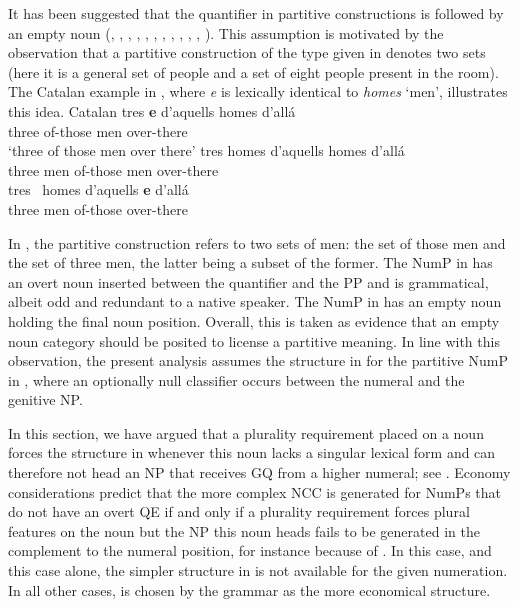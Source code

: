 \documentclass[output=paper,
modfonts,
newtxmath,
hidelinks
]{langscibook}
\begin{document}
It has been suggested that the quantifier in partitive constructions is followed by an empty noun (\citealt{Milner1978}, \citealt{Bonet1986}, \citealt{Abney1987}, \citealt{Hernanz-Brucart1987}, \citealt{Delsing1988, Delsing1993}, \citealt{Ramos1992}, \citealt{Cardinaletti-Giusti1992, Cardinaletti-Giusti2006}, \citealt{Sleeman1996}, \citealt{Doetjes1997}, \citealt{Barker1998}, \citealt{Brucart-Rigau2002}, \citealt{Ionin-etal2006}). This assumption is motivated by the observation that a partitive construction of the type given in  denotes two sets (here it is a general set of people and a set of eight people present in the room). The Catalan example in , where \textit{e} is lexically identical to \textit{homes} ‘men’, illustrates this idea. 
\ea Catalan \citep[27]{MartiiGirbau2010} \label{ex26}
	\ea \label{ex26a}
		\gll tres  \textbf{e}  d’aquells  homes     d’allá\\
			 three {} of-those men over-there\\
		\glt `three of those men over there'
	\ex \label{ex26b}
		\gll tres homes d’aquells homes d’allá\\
			 three men of-those men over-there\\
    \ex \label{ex26c}
		\gll tres~   homes   d’aquells   \textbf{e}   d’allá~ ~\\
			 three men of-those { } over-there\\
	\z
\z

\noindent In , the partitive construction refers to two sets of men: the set of those men and the set of three men, the latter being a subset of the former. The NumP in  has an overt noun inserted between the quantifier and the PP and is grammatical, albeit odd and redundant to a native speaker. The NumP in  has an empty noun holding the final noun position. Overall, this is taken as evidence that an empty noun category should be posited to license a partitive meaning. In line with this observation, the present analysis assumes the structure in  for the partitive NumP in , where an optionally null classifier occurs between the numeral and the genitive NP. 

In this section, we have argued that a plurality requirement placed on a noun forces the structure in  whenever this noun lacks a singular lexical form and can therefore not head an NP that receives GQ from a higher numeral; see . Economy considerations predict that the more complex NCC is generated for NumPs that do not have an overt QE if and only if a plurality requirement forces plural features on the noun but the NP this noun heads fails to be generated in the complement to the numeral position, for instance because of . In this case, and this case alone, the simpler structure in  is not available for the given numeration. In all other cases,  is chosen by the grammar as the more economical structure.
\end{document}
